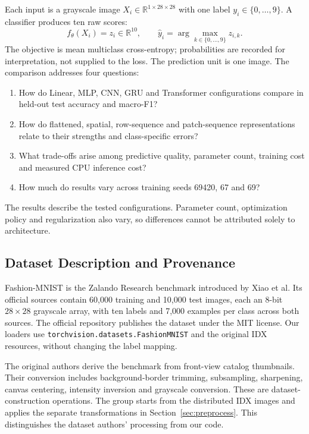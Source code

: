 \documentclass[oneside,final,a4paper]{hcmut-report}
\begin{document}
Each input is a grayscale image \(X_i\in\mathbb{R}^{1\times28\times28}\) with one label
\(y_i\in\{0,\ldots,9\}\). A classifier produces ten raw scores:
\[
 f_\theta(X_i)=z_i\in\mathbb{R}^{10},\qquad
 \widehat y_i=\arg\max_{k\in\{0,\ldots,9\}} z_{i,k}.
\]
The objective is mean multiclass cross-entropy; probabilities are recorded for
interpretation, not supplied to the loss. The prediction unit is one image.
The comparison addresses four questions:
\begin{enumerate}
\item How do Linear, MLP, CNN, GRU and Transformer configurations compare in held-out
test accuracy and macro-F1?
\item How do flattened, spatial, row-sequence and patch-sequence representations relate
to their strengths and class-specific errors?
\item What trade-offs arise among predictive quality, parameter count, training cost
and measured CPU inference cost?
\item How much do results vary across training seeds 69420, 67 and 69?
\end{enumerate}
The results describe the tested configurations. Parameter count, optimization policy
and regularization also vary, so differences cannot be attributed solely to architecture.

\subsection{Dataset Description and Provenance}
Fashion-MNIST is the Zalando Research benchmark introduced by Xiao et al.\citep{fashion}
Its official sources contain 60,000 training and 10,000 test images, each an 8-bit
\(28\times28\) grayscale array, with ten labels and 7,000 examples per class across
both sources. The official repository publishes the dataset under the MIT
license.\citep{fashionlicense} Our loaders use
\texttt{torchvision.datasets.FashionMNIST} and the original IDX resources, without
changing the label mapping.

The original authors derive the benchmark from front-view catalog thumbnails.
Their conversion includes background-border trimming, subsampling, sharpening,
canvas centering, intensity inversion and grayscale conversion.\citep{fashion}
These are dataset-construction operations. The group starts from the distributed
IDX images and applies the separate transformations in Section~\ref{sec:preprocess}.
This distinguishes the dataset authors' processing from our code.
\end{document}
